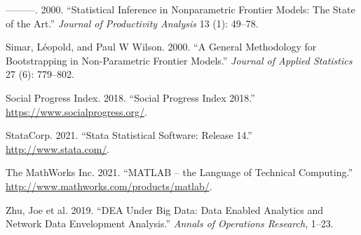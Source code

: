 \begin{CSLReferences}{1}{0}
\leavevmode{}%
---------. 2000. {``Statistical Inference in Nonparametric Frontier Models: The State of the Art.''} \emph{Journal of Productivity Analysis} 13 (1): 49--78.

\leavevmode{}%
Simar, Léopold, and Paul W Wilson. 2000. {``A General Methodology for Bootstrapping in Non-Parametric Frontier Models.''} \emph{Journal of Applied Statistics} 27 (6): 779--802.

\leavevmode{}%
Social Progress Index. 2018. {``Social Progress Index 2018.''} \url{https://www.socialprogress.org/}.

\leavevmode{}%
StataCorp. 2021. {``Stata Statistical Software: Release 14.''} \url{http://www.stata.com/}.

\leavevmode{}%
The MathWorks Inc. 2021. {``MATLAB -- the Language of Technical Computing.''} \url{http://www.mathworks.com/products/matlab/}.

\leavevmode{}%
Zhu, Joe et al. 2019. {``DEA Under Big Data: Data Enabled Analytics and Network Data Envelopment Analysis.''} \emph{Annals of Operations Research}, 1--23.

\end{CSLReferences}



\address{%
Miriam Esteve\\
Miguel Hernandez University\\%
Center of Operations Research\\ 03202 Elche, Spain\\
%
\url{https://cio.umh.es/}\\%
\textit{ORCiD: \href{https://orcid.org/0000-0002-5908-0581}{0000-0002-5908-0581}}\\%
\href{mailto:miriam.estevec@umh.es}{\nolinkurl{miriam.estevec@umh.es}}%
}

\address{%
Victor España\\
Miguel Hernandez University\\%
Center of Operations Research\\ 03202 Elche, Spain\\
%
\url{https://cio.umh.es/}\\%
\textit{ORCiD: \href{https://orcid.org/0000-0002-1807-6180}{0000-0002-1807-6180}}\\%
\href{mailto:vespana@umh.es}{\nolinkurl{vespana@umh.es}}%
}


